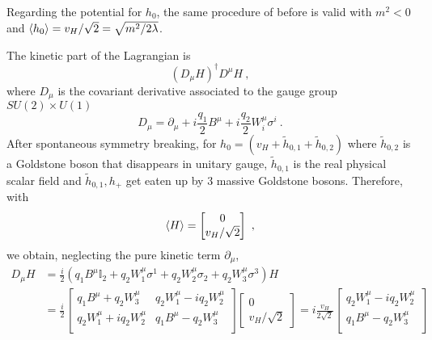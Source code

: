     Regarding the potential for $h_0$, the same procedure of before is valid with $m^2 < 0$ and $\langle h_0\rangle = v_H / \sqrt{2} = \sqrt{m^2 / 2 \lambda}$. 

    The kinetic part of the Lagrangian is 
    \begin{equation*}
        (D_\mu H)^\dagger D^\mu H ~,
    \end{equation*}
    where $D_\mu$ is the covariant derivative associated to the gauge group $SU(2) \times U(1)$
    \begin{equation*}
        D_\mu = \partial_\mu + i \frac{q_1}{2} B^\mu + i \frac{q_2}{2} W^\mu_i \sigma^i ~.
    \end{equation*}
    After spontaneous symmetry breaking, for $h_0 = (v_H + \tilde h_{0,1} + \tilde h_{0,2})$ where $\tilde h_{0,2}$ is a Goldstone boson that disappears in unitary gauge, $\tilde h_{0,1}$ is the real physical scalar field and $\tilde h_{0,1}, h_+$ get eaten up by $3$ massive Goldstone bosons. Therefore, with
    \begin{equation*}
        \langle H\rangle = \begin{bmatrix}
            0 \\ v_H/\sqrt{2} \\
        \end{bmatrix} ~,
    \end{equation*}
    we obtain, neglecting the pure kinetic term $\partial_\mu$,
    \begin{equation*}
    \begin{aligned}
        D_\mu H & = \frac{i}{2} (q_1 B^\mu \mathbb I_2 + q_2 W^\mu_1 \sigma^1 + q_2 W^\mu_2 \sigma_2 + q_2 W^\mu_3 \sigma^3) H \\ & = \frac{i}{2} \begin{bmatrix}
            q_1 B^\mu + q_2 W^\mu_3 & q_2 W^\mu_1 - i q_2 W^\mu_2 \\
            q_2 W^\mu_1 + i q_2 W^\mu_2 & q_1 B^\mu - q_2 W^\mu_3 \\
        \end{bmatrix} \begin{bmatrix}
            0 \\ v_H / \sqrt{2}
        \end{bmatrix} = i \frac{v_H}{2 \sqrt{2}} \begin{bmatrix}
            q_2 W^\mu_1 - i q_2 W^\mu_2 \\ 
            q_1 B^\mu - q_2 W^\mu_3 \\ 
        \end{bmatrix}
    \end{aligned}
    \end{equation*}
